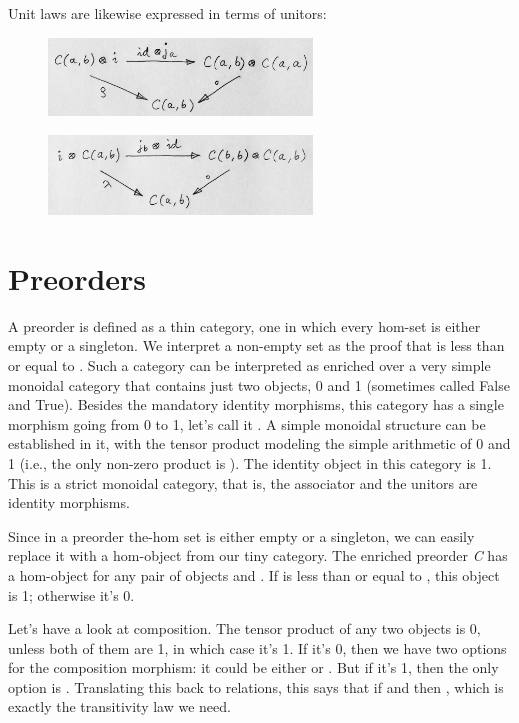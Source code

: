 \noindent
Unit laws are likewise expressed in terms of unitors:

\begin{figure}[H]
\centering
\includegraphics[width=70mm]{images/rightid.jpg}
\end{figure}

\begin{figure}[H]
\centering
\includegraphics[width=70mm]{images/leftid.jpg}
\end{figure}

\section{Preorders}\label{preorders}

A preorder is defined as a thin category, one in which every hom-set is
either empty or a singleton. We interpret a non-empty set
 as the proof that  is less than or equal to
. Such a category can be interpreted as enriched over a very
simple monoidal category that contains just two objects, 0 and 1
(sometimes called False and True). Besides the mandatory identity
morphisms, this category has a single morphism going from 0 to 1, let's
call it . A simple monoidal structure can be
established in it, with the tensor product modeling the simple
arithmetic of 0 and 1 (i.e., the only non-zero product is ).
The identity object in this category is 1. This is a strict monoidal
category, that is, the associator and the unitors are identity
morphisms.

Since in a preorder the-hom set is either empty or a singleton, we can
easily replace it with a hom-object from our tiny category. The enriched
preorder \emph{C} has a hom-object  for any pair of
objects  and . If  is less than or equal
to , this object is 1; otherwise it's 0.

Let's have a look at composition. The tensor product of any two objects
is 0, unless both of them are 1, in which case it's 1. If it's 0, then
we have two options for the composition morphism: it could be either
 or . But if it's 1, then the only
option is . Translating this back to relations, this says
that if  and  then
, which is exactly the transitivity law we
need.

